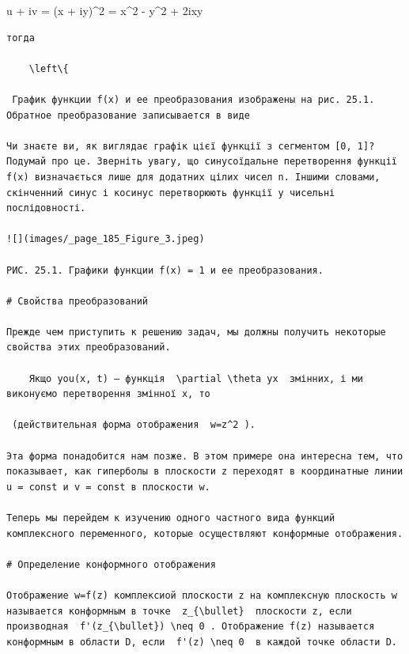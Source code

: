\documentclass[
  ukrainian,
]{article}
\begin{document}
u + iv = (x + iy)\^{}2 = x\^{}2 - y\^{}2 + 2ixy

\begin{verbatim}
тогда

    \left\{

 График функции f(x) и ее преобразования изображены на рис. 25.1. Обратное преобразование записывается в виде

Чи знаєте ви, як виглядає графік цієї функції з сегментом [0, 1]? Подумай про це. Зверніть увагу, що синусоїдальне перетворення функції f(x) визначається лише для додатних цілих чисел n. Іншими словами, скінченний синус і косинус перетворюють функції у чисельні послідовності.

![](images/_page_185_Figure_3.jpeg)

РИС. 25.1. Графики функции f(x) = 1 и ее преобразования.

# Свойства преобразований

Прежде чем приступить к решению задач, мы должны получить некоторые свойства этих преобразований.

    Якщо you(x, t) — функція  \partial \theta yx  змінних, і ми виконуємо перетворення змінної x, то

 (действительная форма отображения  w=z^2 ).

Эта форма понадобится нам позже. В этом примере она интересна тем, что показывает, как гиперболы в плоскости z переходят в координатные линии u = const и v = const в плоскости w.

Теперь мы перейдем к изучению одного частного вида функций комплексного переменного, которые осуществляют конформные отображения.

# Определение конформного отображения

Отображение w=f(z) комплексиой плоскости z на комплексную плоскость w называется конформным в точке  z_{\bullet}  плоскости z, если производная  f'(z_{\bullet}) \neq 0 . Отображение f(z) называется конформным в области D, если  f'(z) \neq 0  в каждой точке области D.


\end{verbatim}
\end{document}
